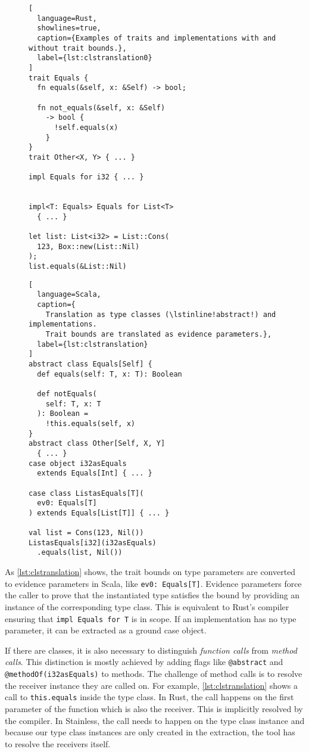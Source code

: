 \begin{figure}
\begin{minipage}[t]{.49\textwidth}
\begin{lstlisting}[
  language=Rust,
  showlines=true,
  caption={Examples of traits and implementations with and without trait bounds.},
  label={lst:clstranslation0}
]
trait Equals {
  fn equals(&self, x: &Self) -> bool;

  fn not_equals(&self, x: &Self)
    -> bool {
      !self.equals(x)
    }
}
trait Other<X, Y> { ... }

impl Equals for i32 { ... }


impl<T: Equals> Equals for List<T>
  { ... }

let list: List<i32> = List::Cons(
  123, Box::new(List::Nil)
);
list.equals(&List::Nil)
\end{lstlisting}
\end{minipage}\hfill
\begin{minipage}[t]{.49\textwidth}
\begin{lstlisting}[
  language=Scala,
  caption={
    Translation as type classes (\lstinline!abstract!) and implementations.
    Trait bounds are translated as evidence parameters.},
  label={lst:clstranslation}
]
abstract class Equals[Self] {
  def equals(self: T, x: T): Boolean

  def notEquals(
    self: T, x: T
  ): Boolean =
    !this.equals(self, x)
}
abstract class Other[Self, X, Y]
  { ... }
case object i32asEquals
  extends Equals[Int] { ... }

case class ListasEquals[T](
  ev0: Equals[T]
) extends Equals[List[T]] { ... }

val list = Cons(123, Nil())
ListasEquals[i32](i32asEquals)
  .equals(list, Nil())
\end{lstlisting}
\end{minipage}
\end{figure}

As \autoref{lst:clstranslation} shows, the trait bounds on type parameters are
converted to evidence parameters in Scala, like \passthrough{\lstinline!ev0:
Equals[T]!}. Evidence parameters force the caller to prove that the instantiated
type satisfies the bound by providing an instance of the corresponding type
class. This is equivalent to Rust's compiler ensuring that
\passthrough{\lstinline!impl Equals for T!} is in scope. If an implementation
has no type parameter, it can be extracted as a ground case object.

If there are classes, it is also necessary to distinguish \emph{function calls}
from \emph{method calls}. This distinction is mostly achieved by adding flags
like \passthrough{\lstinline!@abstract!} and
\passthrough{\lstinline!@methodOf(i32asEquals)!} to methods. The challenge of
method calls is to resolve the receiver instance they are called on. For
example, \autoref{lst:clstranslation} shows a call to \lstinline!this.equals!
inside the type class. In Rust, the call happens on the first parameter of the
function which is also the receiver. This is implicitly resolved by the
compiler. In Stainless, the call needs to happen on the type class instance and
because our type class instances are only created in the extraction, the tool
has to resolve the receivers itself.

